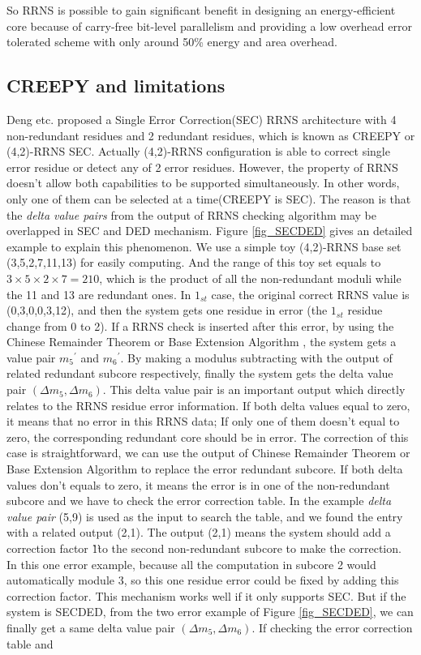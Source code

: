\documentclass{sig-alternate}
\begin{document}
So RRNS is possible to gain significant benefit in designing an energy-efficient core because of carry-free bit-level parallelism and providing a low overhead error tolerated scheme with only around 50\% energy and area overhead. 

\subsection{CREEPY and limitations}
\label{sub:CREEPY}
Deng etc.\cite{DengICRC16,DengTACO18,SrikanthHPCA18} proposed a Single Error Correction(SEC) RRNS architecture with 4 non-redundant residues and 2 redundant residues, which is known as CREEPY or (4,2)-RRNS SEC. 
Actually (4,2)-RRNS configuration is able to correct single error residue or detect any of 2 error residues. However, the property of RRNS doesn't allow both capabilities to be supported simultaneously. In other words, only one of them can be selected at a time(CREEPY is SEC).  The reason is that the \textit{delta value pairs} from the output of RRNS checking algorithm may be overlapped in SEC and DED mechanism.  Figure \ref{fig_SECDED} gives an detailed example to explain this phenomenon. We use a simple toy (4,2)-RRNS base set (3,5,2,7,11,13) for easily computing. And the range of this toy set equals to $3 \times 5 \times 2 \times 7 = 210$, which is the product of all the non-redundant moduli while the 11 and 13 are redundant ones. In $1_{st}$ case, the original correct RRNS value is (0,3,0,0,3,12), and then the system gets one residue in error (the $1_{st}$ residue change from 0 to 2). If a RRNS check is inserted after this error, by using the Chinese Remainder Theorem\cite{goldreich1999chinese} or Base Extension Algorithm \cite{WatsonHastings,WatsonThesis}, the system gets a value pair ${m_{5}}^{'}$ and ${m_{6}}^{'}$. By making a modulus subtracting with the output of related redundant subcore respectively, finally the system gets the delta value pair $(\Delta m_{5}, \Delta m_{6})$. This delta value pair is an important output which directly relates to the RRNS residue error information. If both delta values equal to zero, it means that no error in this RRNS data; If only one of them doesn't equal to zero, the corresponding redundant core should be in error. The correction of this case is straightforward, we can use the output of Chinese Remainder Theorem or Base Extension Algorithm to replace the error redundant subcore. If both delta values don't equals to zero, it means the error is in one of the non-redundant subcore and we have to check the error correction table. In the example \textit{delta value pair} (5,9) is used as the input to search the table, and we found the entry with a related output (2,1). The output (2,1) means the system should add a correction factor \`1\` to the second non-redundant subcore to make the correction.  In this one error example, because  all the computation  in subcore 2 would automatically module 3, so this one residue error could be fixed by adding this correction factor. This mechanism works well if it only supports SEC. But if the system is SECDED, from the two error example of  Figure \ref{fig_SECDED}, we can finally get a same delta value pair $(\Delta m_{5}, \Delta m_{6})$. If checking the error correction table and 
\end{document}
